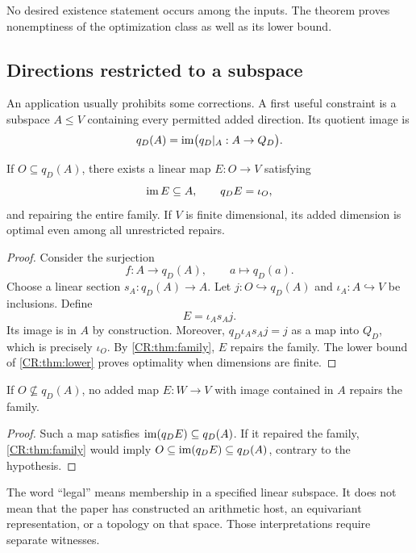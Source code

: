 No desired existence statement occurs among the inputs. The theorem proves nonemptiness of the optimization class as well as its lower bound.

\subsection{Directions restricted to a subspace}
An application usually prohibits some corrections. A first useful constraint is a subspace $A\leq V$ containing every permitted added direction. Its quotient image is
\[
q_D(A)=\operatorname{im}\bigl(q_D\vert_A:A\to Q_D\bigr).
\]

\begin{CRtheorem}\label{CR:thm:legal}
If $O\subseteq q_D(A)$, there exists a linear map $E:O\to V$ satisfying
\[
\operatorname{im} E\subseteq A,\qquad q_DE=\iota_O,
\]
and repairing the entire family. If $V$ is finite dimensional, its added dimension is optimal even among all unrestricted repairs.
\end{CRtheorem}
\begin{proof}
Consider the surjection
\[
f:A\longrightarrow q_D(A),\qquad a\longmapsto q_D(a).
\]
Choose a linear section $s_A:q_D(A)\to A$. Let $j:O\hookrightarrow q_D(A)$ and $\iota_A:A\hookrightarrow V$ be inclusions. Define
\[
E=\iota_As_Aj.
\]
Its image is in $A$ by construction. Moreover, $q_D\iota_As_Aj=j$ as a map into $Q_D$, which is precisely $\iota_O$. By \cref{CR:thm:family}, $E$ repairs the family. The lower bound of \cref{CR:thm:lower} proves optimality when dimensions are finite.
\end{proof}

\begin{CRtheorem}\label{CR:thm:legal-no-go}
If $O\not\subseteq q_D(A)$, no added map $E:W\to V$ with image contained in $A$ repairs the family.
\end{CRtheorem}
\begin{proof}
Such a map satisfies $\operatorname{im}(q_DE)\subseteq q_D(A)$. If it repaired the family, \cref{CR:thm:family} would imply $O\subseteq\operatorname{im}(q_DE)\subseteq q_D(A)$, contrary to the hypothesis.
\end{proof}

The word ``legal'' means membership in a specified linear subspace. It does not mean that the paper has constructed an arithmetic host, an equivariant representation, or a topology on that space. Those interpretations require separate witnesses.

